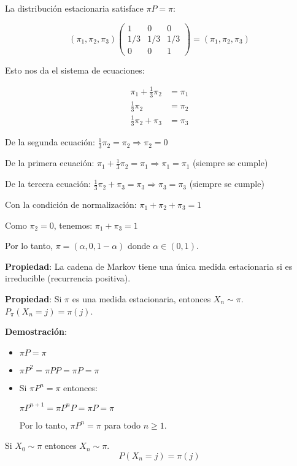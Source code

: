 \documentclass[12pt,a4paper]{article}
\begin{document}
La distribución estacionaria satisface $\pi P = \pi$:

\begin{equation*}
(\pi_1, \pi_2, \pi_3) \begin{pmatrix}
1 & 0 & 0 \\
1/3 & 1/3 & 1/3 \\
0 & 0 & 1
\end{pmatrix} = (\pi_1, \pi_2, \pi_3)
\end{equation*}

Esto nos da el sistema de ecuaciones:

\begin{align*}
\pi_1 + \frac{1}{3} \pi_2 &= \pi_1 \\
\frac{1}{3} \pi_2 &= \pi_2 \\
\frac{1}{3} \pi_2 + \pi_3 &= \pi_3
\end{align*}

De la segunda ecuación: $\frac{1}{3} \pi_2 = \pi_2 \Rightarrow \pi_2 = 0$

De la primera ecuación: $\pi_1 + \frac{1}{3} \pi_2 = \pi_1 \Rightarrow \pi_1 = \pi_1$ (siempre se cumple)

De la tercera ecuación: $\frac{1}{3} \pi_2 + \pi_3 = \pi_3 \Rightarrow \pi_3 = \pi_3$ (siempre se cumple)

Con la condición de normalización: $\pi_1 + \pi_2 + \pi_3 = 1$

Como $\pi_2 = 0$, tenemos: $\pi_1 + \pi_3 = 1$

Por lo tanto, $\pi = (\alpha, 0, 1-\alpha)$ donde $\alpha \in (0,1)$.

\textbf{Propiedad}: La cadena de Markov tiene una única medida estacionaria si es irreducible (recurrencia positiva).

\textbf{Propiedad}: Si $\pi$ es una medida estacionaria, entonces $X_n \sim \pi$. $P_{\pi}(X_n=j) = \pi(j)$.

\textbf{Demostración}:

\begin{itemize}
    \item $\pi P = \pi$
    \item $\pi P^2 = \pi P P = \pi P = \pi$
    \item Si $\pi P^n = \pi$ entonces:
    
    $\pi P^{n+1} = \pi P^n P = \pi P = \pi$
    
    Por lo tanto, $\pi P^n = \pi$ para todo $n \geq 1$.
\end{itemize}

Si $X_0 \sim \pi$ entonces $X_n \sim \pi$.
\begin{equation}
P(X_n=j) = \pi(j)
\end{equation}
\end{document}
